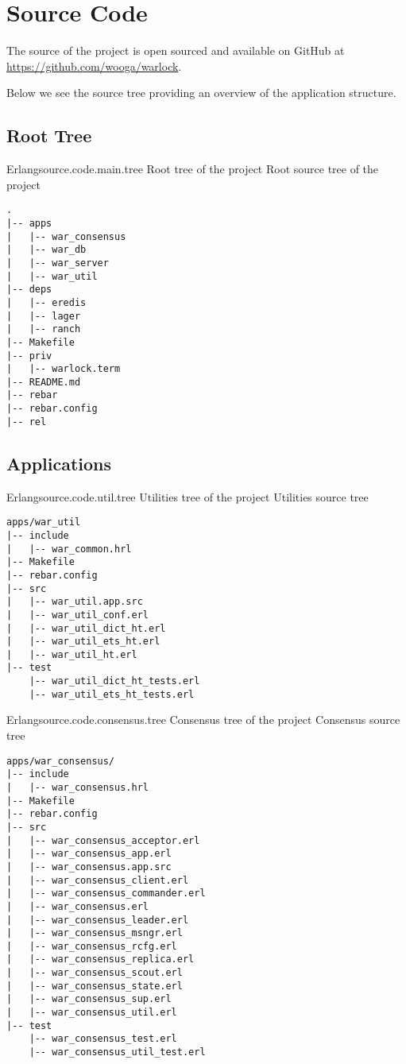 ﻿\chapter{Source Code}
\label{appendix:source.code}

The source of the project is open sourced and available on GitHub at
\url{https://github.com/wooga/warlock}.

Below we see the source tree providing
an overview of the application structure.

\section{Root Tree}

\begin{scode}{Erlang}{source.code.main.tree}{%
  Root tree of the project}{%
  Root source tree of the project}
  \begin{lstlisting}
.
|-- apps
|   |-- war_consensus
|   |-- war_db
|   |-- war_server
|   |-- war_util
|-- deps
|   |-- eredis
|   |-- lager
|   |-- ranch
|-- Makefile
|-- priv
|   |-- warlock.term
|-- README.md
|-- rebar
|-- rebar.config
|-- rel

  \end{lstlisting}
\end{scode}

\section{Applications}

\begin{scode}{Erlang}{source.code.util.tree}{%
  Utilities tree of the project}{%
  Utilities source tree}
  \begin{lstlisting}
apps/war_util
|-- include
|   |-- war_common.hrl
|-- Makefile
|-- rebar.config
|-- src
|   |-- war_util.app.src
|   |-- war_util_conf.erl
|   |-- war_util_dict_ht.erl
|   |-- war_util_ets_ht.erl
|   |-- war_util_ht.erl
|-- test
    |-- war_util_dict_ht_tests.erl
    |-- war_util_ets_ht_tests.erl

  \end{lstlisting}
\end{scode}

\begin{scode}{Erlang}{source.code.consensus.tree}{%
  Consensus tree of the project}{%
  Consensus source tree}
  \begin{lstlisting}
apps/war_consensus/
|-- include
|   |-- war_consensus.hrl
|-- Makefile
|-- rebar.config
|-- src
|   |-- war_consensus_acceptor.erl
|   |-- war_consensus_app.erl
|   |-- war_consensus.app.src
|   |-- war_consensus_client.erl
|   |-- war_consensus_commander.erl
|   |-- war_consensus.erl
|   |-- war_consensus_leader.erl
|   |-- war_consensus_msngr.erl
|   |-- war_consensus_rcfg.erl
|   |-- war_consensus_replica.erl
|   |-- war_consensus_scout.erl
|   |-- war_consensus_state.erl
|   |-- war_consensus_sup.erl
|   |-- war_consensus_util.erl
|-- test
    |-- war_consensus_test.erl
    |-- war_consensus_util_test.erl
  \end{lstlisting}
\end{scode}

